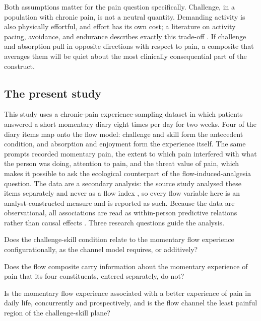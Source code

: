 \documentclass[11pt,a4paper]{article}
\begin{document}
Both assumptions matter for the pain question specifically. Challenge, in a population with
chronic pain, is not a neutral quantity. Demanding activity is also physically effortful, and
effort has its own cost; a literature on activity pacing, avoidance, and endurance describes
exactly this trade-off \citep{andrews2012activity,vlaeyen2000fear}. If challenge and absorption
pull in opposite directions with respect to pain, a composite that averages them will be quiet
about the most clinically consequential part of the construct.

\subsection{The present study}
This study uses a chronic-pain experience-sampling dataset in which patients answered a short
momentary diary eight times per day for two weeks. Four of the diary items map onto the flow
model: challenge and skill form the antecedent condition, and absorption and enjoyment form the
experience itself. The same prompts recorded momentary pain, the extent to which pain interfered
with what the person was doing, attention to pain, and the threat value of pain, which makes it
possible to ask the ecological counterpart of the flow-induced-analgesia question. The data are a
secondary analysis: the source study analysed these items separately and never as a flow index
\citep{viane2004acceptance}, so every flow variable here is an analyst-constructed measure and is
reported as such. Because the data are observational, all associations are read as within-person
predictive relations rather than causal effects \citep{rohrer2018thinking}. Three research questions guide the analysis.

\begin{description}[leftmargin=2.2em,itemsep=2pt]
  \item[\textbf{RQ1.}] Does the challenge-skill condition relate to the momentary flow experience
  configurationally, as the channel model requires, or additively?
  \item[\textbf{RQ2.}] Does the flow composite carry information about the momentary experience of
  pain that its four constituents, entered separately, do not?
  \item[\textbf{RQ3.}] Is the momentary flow experience associated with a better experience of pain
  in daily life, concurrently and prospectively, and is the flow channel the least painful region
  of the challenge-skill plane?
\end{description}
\end{document}
